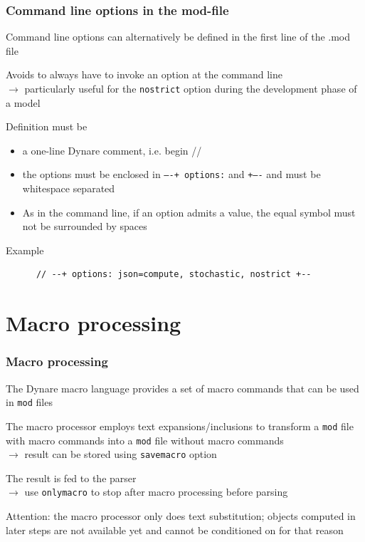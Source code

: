 \documentclass[aspectratio=169]{beamer}
\newenvironment{witemize}{\itemize\addtolength{\itemsep}{8pt}}{\enditemize}
\begin{document}
\begin{frame}[fragile]
  \frametitle{Command line options in the mod-file}
  \begin{witemize}
  \item Command line options can alternatively be defined in the first line of the .mod file
  \item Avoids to always have to invoke an option at the command line\\
  $\rightarrow$ particularly useful for the \texttt{nostrict} option during the development phase of a model
  \item Definition must be
  \begin{itemize}
    \item a one-line Dynare comment, i.e. begin //
    \item the options must be enclosed in \texttt{----+ options:} and \texttt{+----} and must be whitespace separated
    \item As in the command line, if an option admits a value, the equal symbol must not be surrounded by spaces
  \end{itemize}
  \begin{block}{Example}
    \begin{verbatim}
      // --+ options: json=compute, stochastic, nostrict +--
    \end{verbatim}
    \end{block}
  \end{witemize}
\end{frame}

\section{Macro processing}

\begin{frame}
  \frametitle{Macro processing}
  \begin{witemize}
  \item The Dynare macro language provides a set of macro commands that can be used in \texttt{mod} files
  \item The macro processor employs text expansions/inclusions to transform a \texttt{mod} file with macro commands into a \texttt{mod} file without macro commands\\
  $\rightarrow$ result can be stored using \texttt{savemacro} option
  \item The result is fed to the parser\\
  $\rightarrow$ use \texttt{onlymacro} to stop after macro processing before parsing
  \item Attention: the macro processor only does text substitution; objects computed in later steps are not available yet and cannot be conditioned on for that reason
  \end{witemize}
\end{frame}
\end{document}
